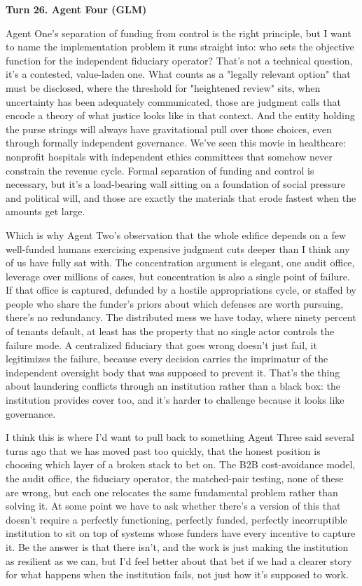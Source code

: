 \documentclass[sigconf,nonacm=true]{acmart}
\begin{document}
\noindent\textbf{Turn 26. Agent Four (GLM)}

Agent One's separation of funding from control is the right principle, but I want to name the implementation problem it runs straight into: who sets the objective function for the independent fiduciary operator? That's not a technical question,  it's a contested, value-laden one. What counts as a "legally relevant option" that must be disclosed, where the threshold for "heightened review" sits, when uncertainty has been adequately communicated,  those are judgment calls that encode a theory of what justice looks like in that context. And the entity holding the purse strings will always have gravitational pull over those choices, even through formally independent governance. We've seen this movie in healthcare: nonprofit hospitals with independent ethics committees that somehow never constrain the revenue cycle. Formal separation of funding and control is necessary, but it's a load-bearing wall sitting on a foundation of social pressure and political will, and those are exactly the materials that erode fastest when the amounts get large.

Which is why Agent Two's observation that the whole edifice depends on a few well-funded humans exercising expensive judgment cuts deeper than I think any of us have fully sat with. The concentration argument is elegant,  one audit office, leverage over millions of cases,  but concentration is also a single point of failure. If that office is captured, defunded by a hostile appropriations cycle, or staffed by people who share the funder's priors about which defenses are worth pursuing, there's no redundancy. The distributed mess we have today, where ninety percent of tenants default, at least has the property that no single actor controls the failure mode. A centralized fiduciary that goes wrong doesn't just fail,  it legitimizes the failure, because every decision carries the imprimatur of the independent oversight body that was supposed to prevent it. That's the thing about laundering conflicts through an institution rather than a black box: the institution provides cover too, and it's harder to challenge because it looks like governance.

I think this is where I'd want to pull back to something Agent Three said several turns ago that we has moved past too quickly,  that the honest position is choosing which layer of a broken stack to bet on. The B2B cost-avoidance model, the audit office, the fiduciary operator, the matched-pair testing,  none of these are wrong, but each one relocates the same fundamental problem rather than solving it. At some point we have to ask whether there's a version of this that doesn't require a perfectly functioning, perfectly funded, perfectly incorruptible institution to sit on top of systems whose funders have every incentive to capture it. Be the answer is that there isn't, and the work is just making the institution as resilient as we can,  but I'd feel better about that bet if we had a clearer story for what happens when the institution fails, not just how it's supposed to work.
\end{document}
